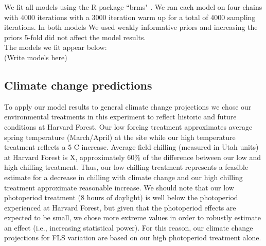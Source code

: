 \documentclass[11pt]{article}
\begin{document}

\noindent We fit all models using the R package ``brms" \citep{}. We ran each model on four chains with 4000 iterations with a 3000 iteration warm up for a total of 4000 sampling iterations. In both models We used weakly informative priors and increasing the priors 5-fold did not affect the model results.\\

The models we fit appear below:\\
(Write models here)
\subsection*{Climate change predictions}
\noindent To apply our model results to general climate change projections we chose our environmental treatments in this experiment to reflect historic and future conditions at Harvard Forest. Our low forcing treatment approximates average spring temperature (March/April) at the site while our high temperature treatment reflects a 5 \degree C increase. Average field chilling (measured in Utah units) at Harvard Forest is X, approximately 60\% of the difference between our low and high chilling treatment. Thus, our low chilling treatment represents a feasible estimate for a decrease in chilling with climate change and our high chilling treatment approximate reasonable increase. We should note that our low photoperiod treatment (8 hours of daylight) is well below the photoperiod experienced at Harvard Forest, but given that the photoperiod effects are expected to be small, we chose more extreme values in order to robustly estimate an effect (i.e., increasing statistical power). For this reason, our climate change projections for FLS variation are based on our high photoperiod treatment alone.\\
\end{document}
